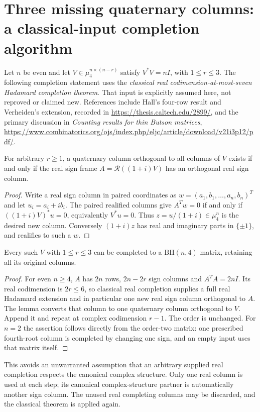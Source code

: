 \section{Three missing quaternary columns: a classical-input completion algorithm}
Let $n$ be even and let $V\in\mu_4^{n\times(n-r)}$ satisfy
$V^*V=nI$, with $1\le r\le3$. The following completion statement
uses the \emph{classical real codimension-at-most-seven Hadamard
completion theorem}. That input is explicitly assumed here, not
reproved or claimed new. References include Hall's four-row result
and Verheiden's extension, recorded in
\url{https://thesis.caltech.edu/2899/}, and the primary discussion in
\emph{Counting results for thin Butson matrices},
\url{https://www.combinatorics.org/ojs/index.php/eljc/article/download/v21i3p12/pdf/}.

\begin{lemma}
For arbitrary $r\ge1$, a quaternary column orthogonal to all columns
of $V$ exists if and only if the real sign frame
$A=\mathcal R((1+i)V)$ has an orthogonal real sign column.
\end{lemma}
\begin{proof}
Write a real sign column in paired coordinates as
$w=(a_1,b_1,\ldots,a_n,b_n)^T$ and let $u_i=a_i+ib_i$.
The paired realified columns give
$A^Tw=0$ if and only if $((1+i)V)^*u=0$, equivalently $V^*u=0$.
Thus $z=u/(1+i)\in\mu_4^n$ is the desired new column.
Conversely $(1+i)z$ has real and imaginary parts in $\{\pm1\}$,
and realifies to such a $w$.
\end{proof}

\begin{theorem}
Every such $V$ with $1\le r\le3$ can be completed to a
$\mathrm{BH}(n,4)$ matrix, retaining all its original columns.
\end{theorem}
\begin{proof}
For even $n\ge4$, $A$ has $2n$ rows, $2n-2r$ sign columns and
$A^TA=2nI$. Its real codimension is $2r\le6$, so classical real
completion supplies a full real Hadamard extension and in particular
one new real sign column orthogonal to $A$. The lemma converts that
column to one quaternary column orthogonal to $V$. Append it and
repeat at complex codimension $r-1$. The order is unchanged.
For $n=2$ the assertion follows directly from the order-two matrix:
one prescribed fourth-root column is completed by changing one sign,
and an empty input uses that matrix itself.
\end{proof}
This avoids an unwarranted assumption that an arbitrary supplied real
completion respects the canonical complex structure. Only one real
column is used at each step; its canonical complex-structure partner
is automatically another sign column. The unused real completing
columns may be discarded, and the classical theorem is applied again.

